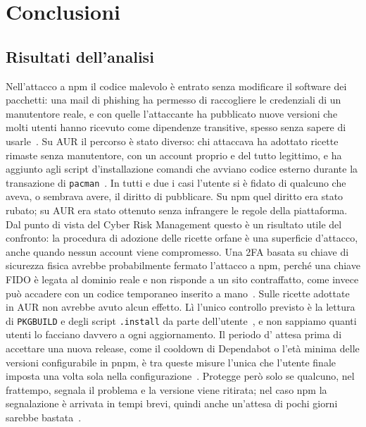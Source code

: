 \section{Conclusioni}
\label{sec:conclusioni}

\subsection{Risultati dell'analisi}
Nell'attacco a npm il codice malevolo è entrato senza modificare il software dei pacchetti: una mail di phishing ha permesso di raccogliere 
le credenziali di un manutentore reale, e con quelle l'attaccante ha pubblicato nuove versioni che molti utenti hanno ricevuto come dipendenze transitive, spesso senza sapere di usarle~\cite{aikido2025,debug2025}.
Su AUR il percorso è stato diverso: chi attaccava ha adottato ricette rimaste senza manutentore, con un account proprio e del tutto legittimo, e ha aggiunto agli script d'installazione 
comandi che avviano codice esterno durante la transazione di \texttt{pacman}~\cite{arch-aur-incident-2026,aur-mail-gnome-randr}. 
In tutti e due i casi l'utente si è fidato di qualcuno che aveva, o sembrava avere, il diritto di pubblicare. 
Su npm quel diritto era stato rubato; su AUR era stato ottenuto senza infrangere le regole della piattaforma. 
Dal punto di vista del Cyber Risk Management questo è un risultato utile del confronto: la procedura di adozione delle ricette orfane è una superficie d'attacco, anche quando nessun account viene compromesso. 
Una 2FA basata su chiave di sicurezza fisica avrebbe probabilmente fermato l'attacco a npm, perché una chiave FIDO è legata al dominio reale e non risponde a un sito contraffatto, come invece può accadere con un codice temporaneo inserito a mano~\cite{npm-2fa-docs-2026}. 
Sulle ricette adottate in AUR non avrebbe avuto alcun effetto. Lì l'unico controllo previsto è la lettura di \texttt{PKGBUILD} e degli script \texttt{.install} da parte dell'utente~\cite{arch-aur-incident-2026}, e non sappiamo quanti utenti lo facciano davvero a ogni aggiornamento. 
Il periodo d' attesa prima di accettare una nuova release, come il cooldown di Dependabot o l'età minima delle versioni configurabile in pnpm, è tra queste misure l'unica che l'utente finale imposta una volta sola nella configurazione~\cite{pnpm-supply-chain,github-dependabot-cooldown}. 
Protegge però solo se qualcuno, nel frattempo, segnala il problema e la versione viene ritirata; 
nel caso npm la segnalazione è arrivata in tempi brevi, quindi anche un'attesa di pochi giorni sarebbe bastata~\cite{aikido2025,debug2025}.
